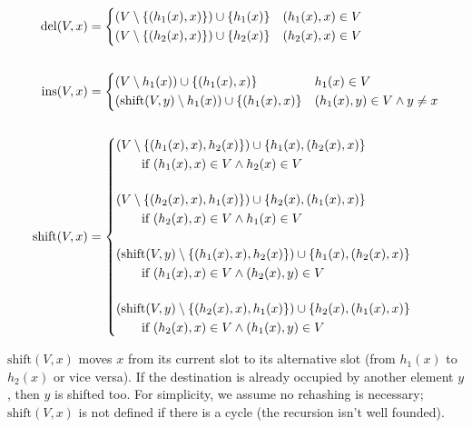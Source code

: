 \documentclass[a4paper, 12pt]{article}
\begin{document}
\begin{align*}
  \mathrm{del}(V, x) &=
                       \begin{dcases}
                         (V \setminus \left\{ (h_1(x), x) \right\}) \cup \left\{ h_1(x) \right\} & (h_1(x), x) \in V \\
                         (V \setminus \left\{ (h_2(x), x) \right\}) \cup \left\{ h_2(x) \right\} & (h_2(x), x) \in V
                       \end{dcases}
  \\[4ex]
  \mathrm{ins}(V, x) &=
                            \begin{dcases}
                              (V \setminus h_1(x)) \cup \left\{ (h_1(x), x) \right\}
                              & h_1(x) \in V
                              \\
                              (\mathrm{shift}(V, y) \setminus h_1(x)) \cup \left\{ (h_1(x), x) \right\}
                              & (h_1(x), y) \in V \wedge y \neq x
                            \end{dcases}
  \\[4ex]
  \mathrm{shift}(V, x) &=
  \begin{dcases}
    (V \setminus \left\{ (h_1(x), x), h_2(x) \right\}) \cup \left\{ h_1(x), (h_2(x), x) \right\} \\
    \qquad \text{if }(h_1(x), x) \in V \wedge h_2(x) \in V \\[3ex]
    (V \setminus \left\{ (h_2(x), x), h_1(x) \right\}) \cup \left\{ h_2(x), (h_1(x), x) \right\} \\
    \qquad \text{if }(h_2(x), x) \in V \wedge h_1(x) \in V \\[3ex]
    (\mathrm{shift}(V, y) \setminus \left\{ (h_1(x), x), h_2(x) \right\}) \cup \left\{ h_1(x), (h_2(x), x) \right\} \\
    \qquad \text{if }(h_1(x), x) \in V \wedge (h_2(x), y) \in V \\[3ex]
    (\mathrm{shift}(V, y) \setminus \left\{ (h_2(x), x), h_1(x) \right\}) \cup \left\{ h_2(x), (h_1(x), x) \right\} \\
    \qquad \text{if }(h_2(x), x) \in V \wedge (h_1(x), y) \in V
  \end{dcases}
\end{align*}

\(\mathrm{shift}(V, x)\) moves \(x\) from its current slot to its alternative slot (from \(h_1(x)\) to \(h_2(x)\) or vice versa). If the destination is already occupied by another element \(y\), then \(y\) is shifted too. For simplicity, we assume no rehashing is necessary; \(\mathrm{shift}(V, x)\) is not defined if there is a cycle (the recursion isn't well founded).
\end{document}
